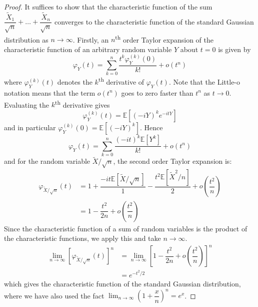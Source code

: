 \documentclass[11pt]{report} %
\begin{document}
\begin{proof}
It suffices to show that the characteristic function of the sum $\dfrac{\widetilde{X}_{1}}{\sqrt{n}} + \dots + \dfrac{\widetilde{X}_{n}}{\sqrt{n}}$ converges to the characteristic function of the standard Gaussian distribution as $n\to\infty$. Firstly, an $n$\textsuperscript{th} order Taylor expansion of the characteristic function of an arbitrary random variable $Y$ about $t = 0$ is given by
\begin{equation}
\varphi_{Y}\left(t\right) = \sum_{k = 0}^{n}\dfrac{t^{k}\varphi_{Y}^{\left(k\right)}\left(0\right)}{k!} + o\left(t^{n}\right)
\end{equation}
where $\varphi_{Y}^{\left(k\right)}\left(t\right)$ denotes the $k$\textsuperscript{th} derivative of $\varphi_{Y}\left(t\right)$. Note that the Little-o notation means that the term $o\left(t^{n}\right)$ goes to zero faster than $t^{n}$ as $t\to 0$. Evaluating the $k$\textsuperscript{th} derivative gives
\begin{equation}
\varphi_{Y}^{\left(k\right)}\left(t\right) = \mathbb{E}\left[\left(-iY\right)^{k}e^{-itY}\right]
\end{equation}
and in particular $\varphi_{Y}^{\left(k\right)}\left(0\right) = \mathbb{E}\left[\left(-iY\right)^{k}\right]$. Hence
\begin{equation}
\varphi_{Y}\left(t\right) = \sum_{k = 0}^{n}\dfrac{\left(-it\right)^{k}\mathbb{E}\left[Y^{k}\right]}{k!} + o\left(t^{n}\right)
\end{equation}
and for the random variable $\widetilde{X}/\sqrt{n}$, the second order Taylor expansion is:
\begin{align}
\varphi_{\widetilde{X}/\sqrt{n}}\left(t\right) &= 1 + \dfrac{-it\mathbb{E}\left[\widetilde{X}/\sqrt{n}\right]}{1} - \dfrac{t^{2}\mathbb{E}\left[\widetilde{X}^{2}/n\right]}{2} + o\left(\dfrac{t^{2}}{n}\right) \\
&= 1 - \dfrac{t^{2}}{2n} + o\left(\dfrac{t^{2}}{n}\right)
\end{align}
Since the characteristic function of a sum of random variables is the product of the characteristic functions, we apply this and take $n\to\infty$.
\begin{align}
\lim_{n\to\infty}\left[\varphi_{\widetilde{X}/\sqrt{n}}\left(t\right)\right]^{n} &= \lim_{n\to\infty}\left[1 - \dfrac{t^{2}}{2n} + o\left(\dfrac{t^{2}}{n}\right)\right]^{n} \\
&= e^{-t^{2}/2}
\end{align}
which gives the characteristic function of the standard Gaussian distribution, where we have also used the fact $\lim_{n\to\infty}\left(1 + \dfrac{x}{n}\right)^{n} = e^{x}$.
\end{proof}
\end{document}
